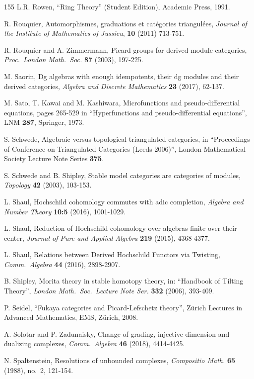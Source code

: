 \begin{thebibliography}{155}
 L.R. Rowen,
``Ring Theory'' (Student Edition), Academic Press, 1991.

 R. Rouquier, 
Automorphismes, graduations et cat\'egories triangul\'ees,
{\em Journal of the Institute of Mathematics of Jussieu}, {\bf 10}
(2011) 713-751.

 R. Rouquier and A. Zimmermann, 
Picard groups for derived module categories, 
{\em Proc.\ London Math.\ Soc.} {\bf 87} (2003), 197-225.

 M. Saorin, 
Dg algebras with enough idempotents, their dg modules and their derived 
categories, 
{\em Algebra and Discrete Mathematics} {\bf 23} (2017), 62-137. 

 M. Sato, T. Kawai and M. Kashiwara,
Microfunctions and pseudo-differential equations,
pages 265-529 in 
``Hyperfunctions and pseudo-differential equations'', 
LNM {\bf 287}, Springer, 1973.

 S. Schwede, 
Algebraic versus topological triangulated categories, 
in ``Proceedings of Conference on Triangulated Categories (Leeds 2006)'',
London Mathematical Society Lecture Note Series {\bf 375}. 

 S. Schwede and B. Shipley, 
Stable model categories are categories of modules, 
{\em Topology} {\bf 42} (2003), 103-153.

 L. Shaul, 
Hochschild cohomology commutes with adic completion,
{\em Algebra and Number Theory} {\bf 10:5} (2016), 1001-1029.

 L. Shaul, 
Reduction of Hochschild cohomology over algebras finite over their center,
{\em Journal of Pure and Applied Algebra} {\bf 219} (2015), 4368-4377.

 L. Shaul, 
Relations between Derived Hochschild Functors via Twisting,
{\em Comm.\ Algebra} {\bf 44} (2016), 2898-2907.

 B. Shipley, 
Morita theory in stable homotopy theory, 
in: ``Handbook of Tilting Theory'', 
{\em London Math.\ Soc.\ Lecture Note Ser.} {\bf 332} (2006), 393-409.

 P. Seidel, 
``Fukaya categories and Picard-Lefschetz theory'', 
Z\"urich Lectures in Advanced Mathematics, EMS, Z\"urich, 2008.

 A. Solotar and P. Zadunaisky,
Change of grading, injective dimension and dualizing complexes,
{\em Comm.\ Algebra} {\bf 46} (2018), 4414-4425.

 N. Spaltenstein, 
Resolutions of unbounded complexes, {\em Compositio Math.} {\bf 65} (1988), no.\
2, 121-154.


\end{thebibliography}
